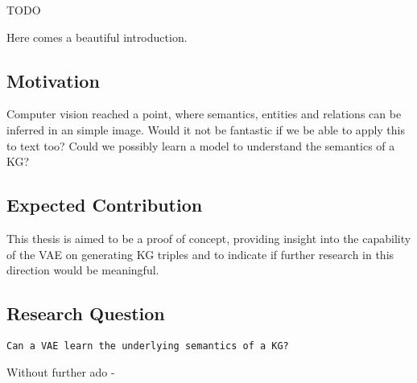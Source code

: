 
TODO

Here comes a beautiful introduction. %


\subsection{Motivation}

Computer vision reached a point, where semantics, entities and relations can be inferred in an simple image.
Would it not be fantastic if we be able to apply this to text too?
Could we possibly learn a model to understand the semantics of a KG?




\subsection{Expected Contribution}

This thesis is aimed to be a proof of concept, providing insight into the capability of the VAE on generating KG triples and to indicate if further research in this direction would be meaningful.

\subsection{Research Question}

\texttt{Can a VAE learn the underlying semantics of a KG?}


Without further ado -
